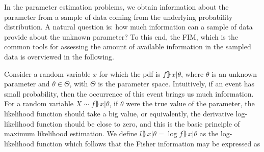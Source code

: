In the parameter estimation problems, we obtain information about the parameter from a sample of data coming from the underlying probability distribution. 
A natural question is: how much information can a sample of data provide about the unknown parameter? 
To this end, the FIM, which is the common tools for assessing the amount of available information in the sampled data is overviewed in the following.
\par
Consider a random variable $x$ for which the pdf is $f\rBrace{x|\theta}$, where $\theta$ is an unknown parameter and $\theta\in\Theta$, with $\Theta$ is the parameter space.
Intuitively, if an event has small probability, then the occurrence of this event brings us much information.
For a random variable $X \sim f\rBrace{x|\theta}$, if $\theta$ were the true value of the parameter, the likelihood function should take a big value, or equivalently, the derivative log-likelihood function should be close to zero, and this is the basic principle of maximum likelihood estimation.
We define $l\rBrace{x|\theta} = \log{f\rBrace{x|\theta}}$ as the log-likelihood function which follows that the Fisher information may be expressed \cite{van2004detection} as 
